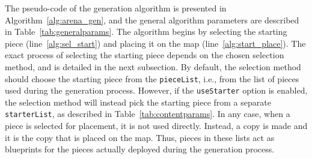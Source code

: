 \documentclass[journal]{IEEEtran}
\begin{document}
The pseudo-code of the generation algorithm is presented in Algorithm~\ref{alg:arena_gen},
and the general algorithm parameters are described in Table~\ref{tab:generalparams}.
The algorithm begins by selecting the starting piece (line~\ref{alg:sel_start}) and
placing it on the map (line~\ref{alg:start_place}). The exact process of selecting the
starting piece depends on the chosen selection method, and is detailed in the next
subsection. By default, the selection method should choose the starting piece from the
\texttt{pieceList}, i.e., from the list of pieces used during the generation process.
However, if the \texttt{useStarter} option is enabled, the selection method will
instead pick the starting piece from a separate \texttt{starterList}, as described in
Table~\ref{tab:contentparams}. In any case, when a
piece is selected for placement, it is not used directly. Instead, a copy is made
and it is the copy that is placed on the map. Thus, pieces in these lists act
as blueprints for the pieces actually deployed during the generation process.
\end{document}
